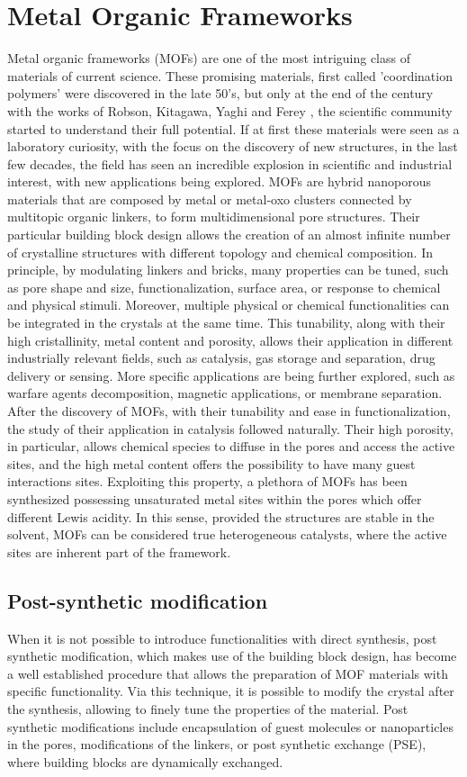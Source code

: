 \section{Metal Organic Frameworks}
Metal organic frameworks (MOFs) are one of the most intriguing class of materials of current science. These promising materials, first called 'coordination polymers' were discovered in the late 50's, but only at the end of the century with the works of Robson, Kitagawa, Yaghi and Ferey , the scientific community started to understand their full potential. If at first these materials were seen as a laboratory curiosity, with the focus on the discovery of new structures, in the last few decades, the field has seen an incredible explosion in scientific and industrial interest, with new applications being explored. MOFs are hybrid nanoporous materials that are composed by metal or metal-oxo clusters connected by multitopic organic linkers, to form multidimensional pore structures. Their particular building block design allows the creation of an almost infinite number of crystalline structures with different topology and chemical composition. In principle, by modulating linkers and bricks, many properties can be tuned, such as pore shape and size, functionalization, surface area, or response to chemical and physical stimuli. Moreover, multiple physical or chemical functionalities can be integrated in the crystals at the same time. This tunability, along with their high cristallinity, metal content and porosity, allows their application in different industrially relevant fields, such as catalysis, gas storage and separation, drug delivery or sensing. More specific applications are being further explored, such as warfare agents decomposition, magnetic applications, or membrane separation. After the discovery of MOFs, with their tunability and ease in functionalization, the study of their application in catalysis followed naturally. Their high porosity, in particular, allows chemical species to diffuse in the pores and access the active sites, and the high metal content offers the possibility to have many guest interactions sites. Exploiting this property, a plethora of MOFs has been synthesized possessing unsaturated metal sites within the pores which offer different Lewis acidity. In this sense, provided the structures are stable in the solvent, MOFs can be considered true heterogeneous catalysts, where the active sites are inherent part of the framework. 

\subsection*{Post-synthetic modification}
When it is not possible to introduce functionalities with direct synthesis, post synthetic modification, which makes use of the building block design, has become a well established procedure that allows the preparation of MOF materials with specific functionality. Via this technique, it is possible to modify the crystal after the synthesis, allowing to finely tune the properties of the material. Post synthetic modifications include encapsulation of guest molecules or nanoparticles in the pores, modifications of the linkers, or post synthetic exchange (PSE), where building blocks are dynamically exchanged.

